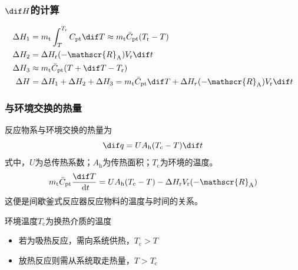 \begin{frame}
    \frametitle{$\dif H$的计算}
    \begin{center}
    \end{center}

    \begin{align*}
        \Delta H_{1}&=m_{\mathrm{t}} \int_{T}^{T_{\mathrm{r}}} C_{\mathrm{pt}} \dif  T \approx m_{\mathrm{t}} \bar{C}_{\mathrm{pt}}(T_{\mathrm{r}}-T)  \\
        \Delta  H_{2} &= \Delta H_{\mathrm{r}}(-\mathscr{R}_{\mathrm{A}}) V_{\mathrm{r}} \dif  t \\
        \Delta H_{3} &\approx m_{\mathrm{t}} \bar{C}_{\mathrm{pt}}(T+\dif  T-T_{\mathrm{r}}) \\
        \Delta  H &= \Delta H_{1}+\Delta  H_{2}+\Delta H_{3}=m_{\mathrm{t}} \bar{C}_{\mathrm{pt}} \dif  T+\Delta H_{r}(-\mathscr{R}_{\mathrm{A}}) V_{\mathrm{r}} \dif  t 
      \end{align*}
    

\end{frame}



\begin{frame}
    \frametitle{与环境交换的热量}

    \large 反应物系与环境交换的热量为
    \[
        \dif q = UA_\mathrm{h}(T_\mathrm{c}-T)\dif t
    \]
    式中，$U$为总传热系数；$A_\mathrm{h}$为传热面积；$T_\mathrm{c}$为环境的温度。
    \[
        m_{\mathrm{t}} \bar{C}_{\mathrm{pt}} \frac{\dif  T}{\mathrm{~d} t}=U A_{\mathrm{h}}(T_{\mathrm{c}}-T)-\Delta H_{\mathrm{r}} V_{\mathrm{r}}(-\mathscr{R}_{\mathrm{A}})
    \]
    这便是间歇釜式反应器反应物料的温度与时间的关系。

    环境温度$T_{\mathrm{c}}$为换热介质的温度
    \begin{itemize}
        \item[\bullet] 若为吸热反应，需向系统供热，$T_{\mathrm{c}}>T$
        \item[\bullet] 放热反应则需从系统取走热量，$T>T_{\mathrm{c}}$
    \end{itemize}

\end{frame}


